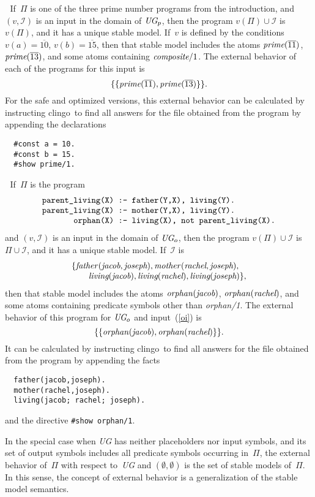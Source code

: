 \documentclass{new_tlp}
\def\beq{\begin{equation}}
\def\eeq#1{\label{#1}\end{equation}}
\def\ba{\begin{array}}
\def\ea{\end{array}}
\def\clingo{{\sc clingo}}
\def\num{\overline}
\newcommand{\I}{\mathcal{I}}
\begin{document}
\medskip{}$\;$ If~$\Pi$ is one of the
three prime number programs from the introduction, and $(v,\I)$ is an
input in the domain of $\emph{UG}_p$, then the program $v(\Pi)\cup\I$
is $v(\Pi)$, and it has a unique stable model.  If~$v$ is defined by
the conditions
$v(a)=\num{10}$, $v(b)=\num{15}$,
then that stable model includes the atoms $\emph{prime}(\num{11})$,
$\emph{prime}(\num{13})$, and some atoms containing
$\emph{composite}/1$.  The external behavior of each of the programs
for this input is
$$\{\{\emph{prime}(\num{11}),\emph{prime}(\num{13})\}\}.$$
For the safe and optimized versions, this external behavior
can be calculated by instructing \clingo\ to
find all answers for the file obtained from the program by appending the
declarations
\begin{verbatim}
  #const a = 10.
  #const b = 15.
  #show prime/1.
\end{verbatim}

\medskip{}$\;$ If~$\Pi$ is the program
\beq\ba l
\verb|parent_living(X) :- father(Y,X), living(Y).|\\
\verb|parent_living(X) :- mother(Y,X), living(Y).|\\
\verb|       orphan(X) :- living(X), not parent_living(X).|
\ea\eeq{orphan1}
and $(v,\I)$ is an input in the domain of $\emph{UG}_o$, then the
program $v(\Pi)\cup\I$ is $\Pi\cup\I$, and it has a unique stable model.
If~$\I$ is
\beq\ba l
\{\emph{father\/}(\emph{jacob},\emph{joseph}),
\emph{mother\/}(\emph{rachel},\emph{joseph}),\\
\quad \quad \emph{living}(\emph{jacob}),
\emph{living}(\emph{rachel}),
\emph{living}(\emph{joseph})\},
\ea\eeq{oi}
then that stable model includes the atoms
$\emph{orphan\/}(\emph{jacob})$, $\emph{orphan\/}(\emph{rachel})$,
and some atoms containing predicate symbols other than \emph{orphan/1}.
The external behavior of this program for $\emph{UG}_o$ and input~(\ref{oi})
is
\beq
\{\{\emph{orphan\/}(\emph{jacob}),\emph{orphan\/}(\emph{rachel})\}\}.
\eeq{ebor}
It can be calculated by instructing \clingo\ to
find all answers for the file obtained from the program by appending the
facts
\begin{verbatim}
  father(jacob,joseph).
  mother(rachel,joseph).
  living(jacob; rachel; joseph).
\end{verbatim}
and the directive \verb|#show orphan/1|.

\medskip
In the special case when \emph{UG} has neither placeholders nor input symbols,
and its set of output symbols includes all predicate symbols occurring
in~$\Pi$, the external
behavior of~$\Pi$ with respect to~\emph{UG} and $(\emptyset,\emptyset)$
is the set of stable models of~$\Pi$.  In this sense, the concept of
external behavior is a generalization of the stable model semantics.
\end{document}
